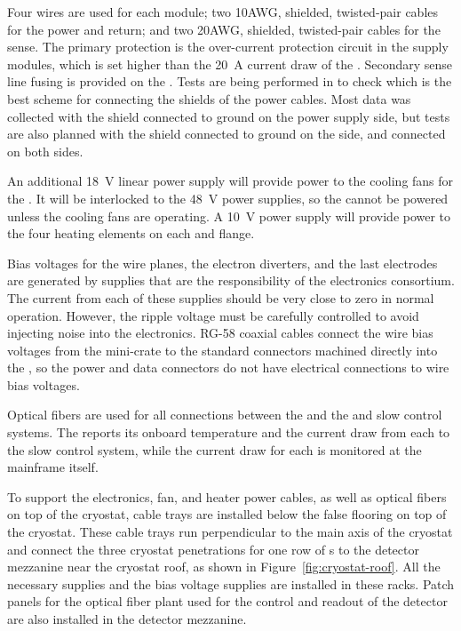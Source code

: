 Four wires are used for each module; two 10AWG, shielded, twisted-pair 
cables for the power and return; and two 20AWG, shielded, twisted-pair 
cables for the sense. The primary protection is the over-current 
protection circuit in the  supply modules, which is set 
higher than the \SI{20}{A} current draw of the . 
Secondary sense line fusing is provided on the .  
Tests are being performed in  to check which is the
best scheme for connecting the shields of the power cables. Most 
data was collected with the shield connected to ground on the 
power supply side, but tests are also planned with the shield
connected to ground on the  side, and connected on both sides. %

An additional \SI{18}{V} linear power supply will provide power to the 
cooling fans for the . It will be interlocked to the \SI{48}{V} 
power supplies, so the  cannot be powered unless the cooling 
fans are operating. A \SI{10}{V} power supply will provide power to the four 
heating elements on each  and  flange.

Bias voltages for the  wire planes, the electron diverters, 
and the last  electrodes are generated by supplies that are 
the responsibility of the  electronics consortium.  The 
current from each of these supplies should be very close to zero in 
normal operation. However, the ripple voltage must be carefully 
controlled to avoid injecting noise into the  electronics.  
RG-58 coaxial cables connect the wire bias voltages from the mini-crate 
to the standard  connectors machined directly into the 
 \fdth, so the  power and data connectors do not 
have electrical connections to wire bias voltages.

Optical fibers are used for all connections between the  %
and the  and slow 
control systems.  The  reports its onboard temperature 
and the current draw from each  to the slow control system, 
while the current draw for each  is monitored at the 
mainframe itself.

To support the electronics, fan, and heater power cables, as well 
as optical fibers on top of the cryostat, cable trays are installed
below the false flooring on top of the cryostat. These cable trays
run perpendicular to the main axis of the cryostat and connect the
three cryostat penetrations for one row of s to the detector
mezzanine near the cryostat roof, as shown in Figure~\ref{fig:cryostat-roof}.
All the necessary  supplies and %
the bias
voltage supplies are installed in these racks. Patch panels for
the optical fiber plant used for the control and readout of the
detector are also installed in  the detector mezzanine.

